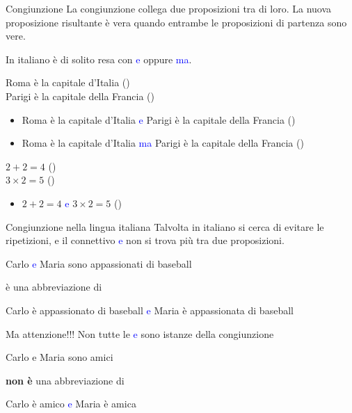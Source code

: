 \documentclass[aspectratio=169,10pt]{beamer}
\newcommand{\xmark}{{\color{red}{\ding{55}}}}
\newcommand{\conn}[1]{\textcolor{blue}{#1}}
\begin{document}
\begin{frame}{Congiunzione}
    La \alert{congiunzione} collega due proposizioni tra di loro. La nuova proposizione risultante è vera quando entrambe le proposizioni di partenza sono vere. \medskip

    In italiano è di solito resa con \conn{e} oppure \conn{ma}.
    \begin{example}
        Roma è la capitale d'Italia (\checkmark) \\
        Parigi è la capitale della Francia (\checkmark) \pause
        \begin{itemize}
            \item Roma è la capitale d'Italia \conn{e} Parigi è la capitale della Francia (\checkmark)
            \item Roma è la capitale d'Italia \conn{ma} Parigi è la capitale della Francia (\checkmark)
        \end{itemize}
        \medskip

        \pause
        $2+2 = 4$ (\checkmark) \\
        $3 \times 2= 5$  (\xmark) \pause
        \begin{itemize}
            \item $2+2 = 4$ \conn{e} $3 \times  2= 5$  (\xmark)
        \end{itemize}
    \end{example}
\end{frame}

\begin{frame}{Congiunzione nella lingua italiana}
    Talvolta in italiano si cerca di evitare le ripetizioni, e il connettivo \conn{e} non si trova più tra due proposizioni.

    \begin{example}
        Carlo \conn{e} Maria sono appassionati di baseball \medskip

        \hspace{2cm} è una abbreviazione di\medskip

        Carlo è appassionato di baseball \conn{e} Maria è appassionata di baseball
    \end{example}

    \pause
    Ma attenzione!!! Non tutte le \conn{e} sono istanze della congiunzione
    \begin{example}
        Carlo e Maria sono amici\medskip

        \hspace{2cm} \textbf{non è} una abbreviazione di\medskip

        Carlo è amico \conn{e} Maria è amica\medskip
    \end{example}
\end{frame}
\end{document}
